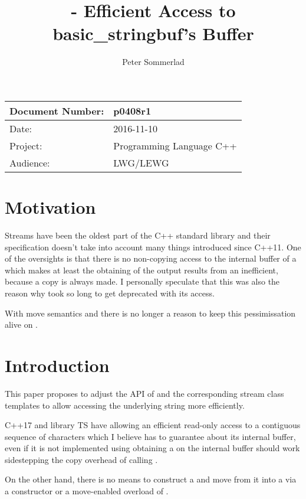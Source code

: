 \documentclass[ebook,11pt,article]{memoir}
\title{\papernumber{} - Efficient Access to basic\_stringbuf's Buffer}
\author{Peter Sommerlad}
\date{\paperdate}                        %
\newcommand{\papernumber}{p0408r1}
\newcommand{\paperdate}{2016-11-10}
\begin{document}
\maketitle
\begin{tabular}[t]{|l|l|}\hline 
Document Number: & \papernumber  \\\hline
Date: & \paperdate \\\hline
Project: & Programming Language C++\\\hline 
Audience: & LWG/LEWG\\\hline
\end{tabular}

\chapter{Motivation}
Streams have been the oldest part of the C++ standard library and their specification doesn't take into account many things introduced since C++11. One of  the oversights is that there is no non-copying access to the internal buffer of a  which makes at least the obtaining of the output results from an  inefficient, because a copy is always made. I personally speculate that this was also the reason why  took so long to get deprecated with its  access.

With move semantics and  there is no longer a reason to keep this pessimissation alive on .



\chapter{Introduction}
This paper proposes to adjust the API of  and the corresponding stream class templates to allow accessing the underlying string more efficiently.

C++17 and library TS have  allowing an efficient read-only access to a contiguous sequence of characters which I believe  has to guarantee about its internal buffer, even if it is not implemented using  obtaining a  on the internal buffer should work sidestepping the copy overhead of calling . 

On the other hand, there is no means to construct a  and move from it into a  via a constructor or a move-enabled overload of .
\end{document}
